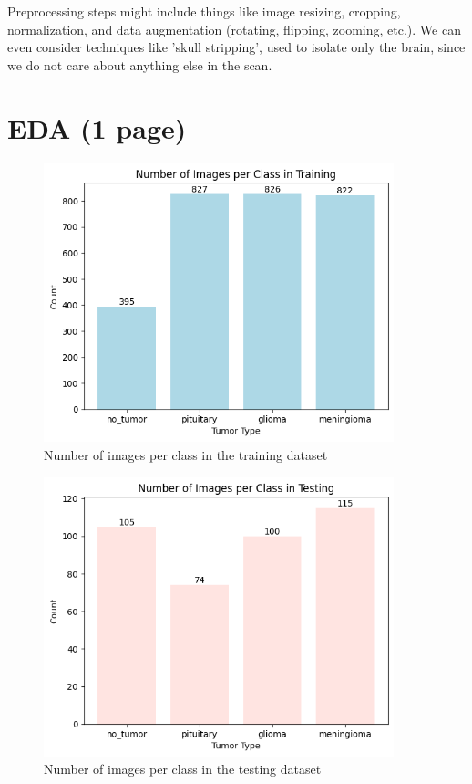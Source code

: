 \documentclass[conference]{IEEEtran}
\begin{document}
Preprocessing steps might include things like image resizing, cropping, normalization, and data augmentation (rotating, flipping, zooming, etc.). We can even consider techniques like 'skull stripping', used to isolate only the brain, since we do not care about anything else in the scan.


\section{EDA (1 page)}



\begin{figure}[!ht]
    \centering
    \includegraphics[width=4in]{ImagesPerClassTraining.png}
    \caption{Number of images per class in the training dataset}
    \label{Number of images per class in the training dataset}
\end{figure}

\begin{figure}[!ht]
    \centering
    \includegraphics[width=4in]{ImagesPerClassTesting.png}
    \caption{Number of images per class in the testing dataset}
    \label{Number of images per class in the testing dataset}
\end{figure}
\end{document}
